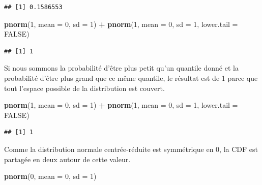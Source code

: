 \documentclass[
]{book}
\newenvironment{Shaded}{\begin{snugshade}}{\end{snugshade}}
\newcommand{\AttributeTok}[1]{\textcolor[rgb]{0.13,0.29,0.53}{#1}}
\newcommand{\ConstantTok}[1]{\textcolor[rgb]{0.56,0.35,0.01}{#1}}
\newcommand{\DecValTok}[1]{\textcolor[rgb]{0.00,0.00,0.81}{#1}}
\newcommand{\FunctionTok}[1]{\textcolor[rgb]{0.13,0.29,0.53}{\textbf{#1}}}
\newcommand{\NormalTok}[1]{#1}
\newcommand{\SpecialCharTok}[1]{\textcolor[rgb]{0.81,0.36,0.00}{\textbf{#1}}}
\begin{document}
\begin{verbatim}
## [1] 0.1586553
\end{verbatim}

\begin{Shaded}
\begin{Highlighting}[]
\FunctionTok{pnorm}\NormalTok{(}\DecValTok{1}\NormalTok{, }\AttributeTok{mean =} \DecValTok{0}\NormalTok{, }\AttributeTok{sd =} \DecValTok{1}\NormalTok{) }\SpecialCharTok{+} \FunctionTok{pnorm}\NormalTok{(}\DecValTok{1}\NormalTok{, }\AttributeTok{mean =} \DecValTok{0}\NormalTok{, }\AttributeTok{sd =} \DecValTok{1}\NormalTok{, }\AttributeTok{lower.tail =} \ConstantTok{FALSE}\NormalTok{)}
\end{Highlighting}
\end{Shaded}

\begin{verbatim}
## [1] 1
\end{verbatim}

Si nous sommons la probabilité d'être plus petit qu'un quantile donné et la probabilité d'être plus grand que ce même quantile, le résultat est de 1 parce que tout l'espace possible de la distribution est couvert.

\begin{Shaded}
\begin{Highlighting}[]
\FunctionTok{pnorm}\NormalTok{(}\DecValTok{1}\NormalTok{, }\AttributeTok{mean =} \DecValTok{0}\NormalTok{, }\AttributeTok{sd =} \DecValTok{1}\NormalTok{) }\SpecialCharTok{+} \FunctionTok{pnorm}\NormalTok{(}\DecValTok{1}\NormalTok{, }\AttributeTok{mean =} \DecValTok{0}\NormalTok{, }\AttributeTok{sd =} \DecValTok{1}\NormalTok{, }\AttributeTok{lower.tail =} \ConstantTok{FALSE}\NormalTok{)}
\end{Highlighting}
\end{Shaded}

\begin{verbatim}
## [1] 1
\end{verbatim}

Comme la distribution normale centrée-réduite est symmétrique en 0, la CDF est partagée en deux autour de cette valeur.

\begin{Shaded}
\begin{Highlighting}[]
\FunctionTok{pnorm}\NormalTok{(}\DecValTok{0}\NormalTok{, }\AttributeTok{mean =} \DecValTok{0}\NormalTok{, }\AttributeTok{sd =} \DecValTok{1}\NormalTok{) }
\end{Highlighting}
\end{Shaded}
\end{document}
